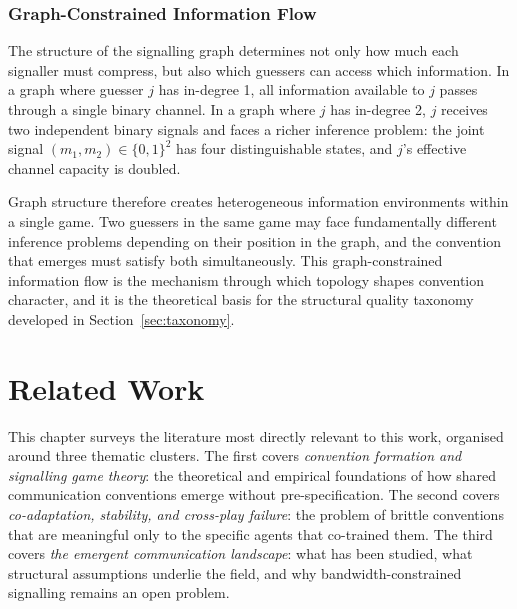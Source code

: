 \documentclass[a4paper,twoside,12pt]{report}
\begin{document}
    \subsection*{Graph-Constrained Information Flow}
    
    The structure of the signalling graph determines not only how much each
    signaller must compress, but also which guessers can access which
    information. In a graph where guesser $j$ has in-degree 1, all
    information available to $j$ passes through a single binary channel.
    In a graph where $j$ has in-degree 2, $j$ receives two independent binary
    signals and faces a richer inference problem: the joint signal
    $(m_1, m_2) \in \{0,1\}^2$ has four distinguishable states, and $j$'s
    effective channel capacity is doubled.
    
    Graph structure therefore creates heterogeneous information environments
    within a single game. Two guessers in the same game may face fundamentally
    different inference problems depending on their position in the graph,
    and the convention that emerges must satisfy both simultaneously. This
    graph-constrained information flow is the mechanism through which topology
    shapes convention character, and it is the theoretical basis for the
    structural quality taxonomy developed in Section~\ref{sec:taxonomy}.
    
    \chapter{Related Work}
    \label{chap:related}
    This chapter surveys the literature most directly relevant to this work,
    organised around three thematic clusters. The first covers
    \emph{convention formation and signalling game theory}: the theoretical
    and empirical foundations of how shared communication conventions emerge
    without pre-specification. The second covers \emph{co-adaptation,
    stability, and cross-play failure}: the problem of brittle conventions
    that are meaningful only to the specific agents that co-trained them. The
    third covers \emph{the emergent communication landscape}: what has been
    studied, what structural assumptions underlie the field, and why
    bandwidth-constrained signalling remains an open problem.
    
\end{document}
